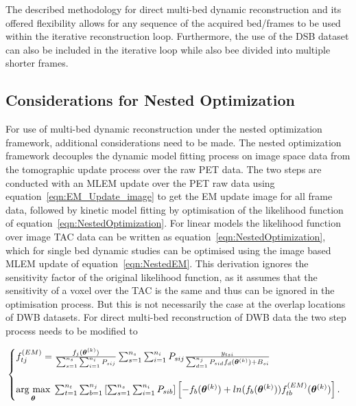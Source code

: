 The described methodology for direct multi-bed dynamic reconstruction and its offered flexibility allows for any sequence of the acquired bed/frames to be used within the iterative reconstruction loop. Furthermore, the use of the DSB dataset can also be included in the iterative loop while also bee divided into multiple shorter frames.

\subsection{Considerations for Nested Optimization}
For use of multi-bed dynamic reconstruction under the nested optimization framework, additional considerations need to be made.
The nested optimization framework decouples the dynamic model fitting process on image space data from the tomographic update process over the raw PET data. The two steps are conducted with an MLEM update over the PET raw data using equation~\ref{eqn:EM_Update_image} to get the EM update image for all frame data, followed by kinetic model fitting by optimisation of the likelihood function of equation~\ref{eqn:NestedOptimization}. 
For linear models the likelihood function over image TAC data can be written as equation~\ref{eqn:NestedOptimization}, which for single bed dynamic studies can be optimised using the image based MLEM update of equation~\ref{eqn:NestedEM}.
This derivation ignores the sensitivity factor of the original likelihood function, as it assumes that the sensitivity of a voxel over the TAC is the same and thus can be ignored in the optimisation process. 
But this is not necessarily the case at the overlap locations of DWB datasets. 
For direct multi-bed reconstruction of DWB data the two step process needs to be modified to

\begin{equation}
\label{eq3_3:NestedMultibed}
\text{}
\begin{cases}  
f_{tj}^{(EM)} = \frac{f_j(\bm\theta^{(k)})}{\sum_{s=1}^{n_s} \sum_{i=1}^{n_i} P_{sij}} 
\sum_{s=1}^{n_s} \sum_{i=1}^{n_i} P_{sij} 
\frac{y_{tsi}}{\sum_{d=1}^{n_j} P_{sid} f_d(\bm\theta^{(k)}) + B_{si} } \\ \\
\underset{\bm{\theta}}{\operatorname{arg}\,\operatorname{max}}\; 
\sum_{t=1}^{n_t} \sum_{b=1}^{n_j} \left[ \sum_{s=1}^{n_s} \sum_{i=1}^{n_i}  P_{sib} \right]
\left[ -f_b(\bm\theta^{(k)}) + 
ln( f_b(\bm\theta^{(k)})) 
f_{tb}^{(EM)}(\bm{\theta}^{(k)})
\right] .\\
\end{cases}
\end{equation}

